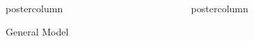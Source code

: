 \documentclass[final,hyperref={pdfpagelabels=false}]{beamer}
\newlength{\columnheight}
\begin{document}
\begin{frame}
\begin{columns}[T]
\begin{column}{.33\textwidth}
\begin{beamercolorbox}[center,wd=\textwidth]{postercolumn}
\begin{minipage}[T]{.95\textwidth}
{\begin{block}{General Model}
\begin{columns}
\begin{column}{.99\textwidth}
\begin{itemize}
\begin{itemize}
                      \end{itemize}
                  \end{itemize}
                \end{column}
              \end{columns}
            \end{block}
          }
        \end{minipage}
      \end{beamercolorbox}
    \end{column}

    \begin{column}{.33\textwidth}
      \begin{beamercolorbox}[center,wd=\textwidth]{postercolumn}
        \begin{minipage}[T]{.95\textwidth} %
          \parbox[t][\columnheight]{\textwidth}{ %

}
\end{minipage}
\end{beamercolorbox}
\end{column}
\end{columns}
\end{frame}
\end{document}
